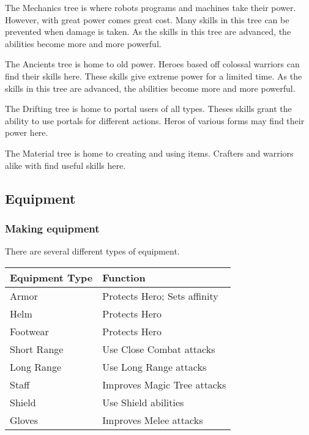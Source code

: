 The Mechanics tree is where robots programs and machines
take their power. However, with great power comes great cost. Many skills in
this tree can be prevented when damage is taken. As the skills in this tree are
advanced, the abilities become more and more powerful. 

The Ancients tree is home to old power. Heroes based off
colossal warriors can find their skills here. These skills give extreme power
for a limited time. As the skills in this tree are advanced, the abilities
become more and more powerful. 

The Drifting tree is home to portal users of all types.
Theses skills grant the ability to use portals for different actions. Heros of
various forms may find their power here. 

The Material tree is home to creating and using items. Crafters and warriors
alike with find useful skills here. 

\subsection{Equipment}
\subsubsection{Making equipment}
There are several different types of equipment. \\
\begin{tabularx}{\textwidth}{X X}
\hline
Equipment Type & Function \\
\hline 
Armor & Protects Hero; Sets affinity\\
Helm & Protects Hero\\
Footwear & Protects Hero\\ 
Short Range & Use Close Combat attacks\\
Long Range & Use Long Range attacks \\
Staff & Improves Magic Tree attacks\\
Shield & Use Shield abilities\\
Gloves & Improves Melee attacks\\
\hline
\end{tabularx}\\

